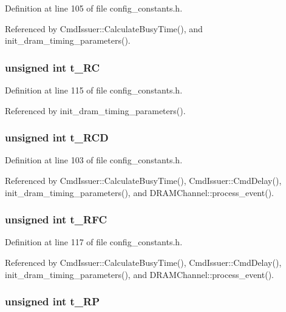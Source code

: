 Definition at line 105 of file config\_\-constants.h.

Referenced by CmdIssuer::CalculateBusyTime(), and init\_\-dram\_\-timing\_\-parameters().
\subsubsection[{t\_\-RC}]{\setlength{\rightskip}{0pt plus 5cm}unsigned int {\bf t\_\-RC}}\label{mc__constants_8h_79559d27472208bb02441e04888bd54a}




Definition at line 115 of file config\_\-constants.h.

Referenced by init\_\-dram\_\-timing\_\-parameters().
\subsubsection[{t\_\-RCD}]{\setlength{\rightskip}{0pt plus 5cm}unsigned int {\bf t\_\-RCD}}\label{mc__constants_8h_aa87244132c2e3faa1124526a73df03e}




Definition at line 103 of file config\_\-constants.h.

Referenced by CmdIssuer::CalculateBusyTime(), CmdIssuer::CmdDelay(), init\_\-dram\_\-timing\_\-parameters(), and DRAMChannel::process\_\-event().
\subsubsection[{t\_\-RFC}]{\setlength{\rightskip}{0pt plus 5cm}unsigned int {\bf t\_\-RFC}}\label{mc__constants_8h_e165ad81efdc23c240188b3cd1133f84}




Definition at line 117 of file config\_\-constants.h.

Referenced by CmdIssuer::CalculateBusyTime(), CmdIssuer::CmdDelay(), init\_\-dram\_\-timing\_\-parameters(), and DRAMChannel::process\_\-event().
\subsubsection[{t\_\-RP}]{\setlength{\rightskip}{0pt plus 5cm}unsigned int {\bf t\_\-RP}}\label{mc__constants_8h_324f7d78eb3d35debb397cca635c5230}




